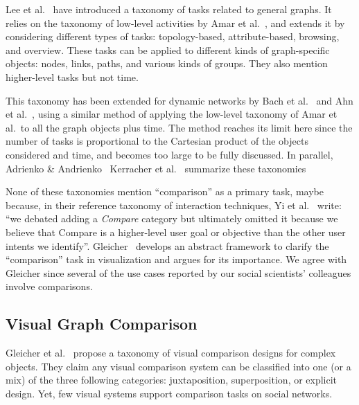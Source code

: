 Lee et al.~\cite{lee:hal-00851754} have introduced a taxonomy of tasks related to general graphs.
It relies on the taxonomy of low-level activities by Amar et al.~\cite{Amar05}, and extends it by considering different types of tasks: topology-based, attribute-based, browsing, and overview. These tasks can be applied to different kinds of graph-specific objects: nodes, links, paths, and various kinds of groups.
They also mention higher-level tasks but not time.

This taxonomy has been extended for dynamic networks by Bach et al.~\cite{bach:hal-00906597} and Ahn et al.~\cite{Ahn14}, using a similar method of applying the low-level taxonomy of Amar et al.\ to all the graph objects plus time. The method reaches its limit here since the number of tasks is proportional to the Cartesian product of the objects considered and time, and becomes too large to be fully discussed.
In parallel, Adrienko \& Andrienko~\cite{andrienko2006exploratory}
Kerracher et al.~\cite{Kerracher15} summarize these taxonomies 

None of these taxonomies mention ``comparison'' as a primary task, maybe because, in their reference taxonomy of interaction techniques, Yi et al.~\cite{yiDeeperUnderstandingRole2007} write: ``we debated adding a \emph{Compare} category but ultimately
omitted it because we believe that Compare is a higher-level user goal or objective than the other user intents we identify''. Gleicher~\cite{Gleicher18, gleicherVisualComparisonInformation2011} develops an abstract framework to clarify the ``comparison'' task in visualization and argues for its importance.
We agree with Gleicher since several of the use cases reported by our social scientists' colleagues involve comparisons.
\fi

\subsection{Visual Graph Comparison}

Gleicher et al.~\cite{Gleicher18} propose a taxonomy of visual comparison designs for complex objects. They claim any visual comparison system can be classified into one (or a mix) of the three following categories: juxtaposition, superposition, or explicit design.
Yet, few visual systems support comparison tasks on social networks.

